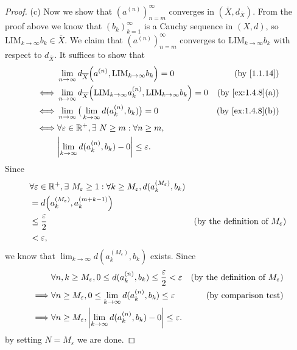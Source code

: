 \begin{proof}{(c)}
  Now we show that \((a^{(n)})_{n = m}^\infty\) converges in \((\overline{X}, d_{\overline{X}})\).
  From the proof above we know that \((b_k)_{k = 1}^\infty\) is a Cauchy sequence in \((X, d)\), so \(\text{LIM}_{k \to \infty} b_k \in \overline{X}\).
  We claim that \((a^{(n)})_{n = m}^\infty\) converges to \(\text{LIM}_{k \to \infty} b_k\) with respect to \(d_{\overline{X}}\).
  It suffices to show that
  \begin{align*}
         & \lim_{n \to \infty} d_{\overline{X}}\Big(a^{(n)}, \text{LIM}_{k \to \infty} b_k\Big) = 0                             & \text{(by \cref{1.1.14})}      \\
    \iff & \lim_{n \to \infty} d_{\overline{X}}\Big(\text{LIM}_{k \to \infty} a_k^{(n)}, \text{LIM}_{k \to \infty} b_k\Big) = 0 & \text{(by \cref{ex:1.4.8}(a))} \\
    \iff & \lim_{n \to \infty} \big(\lim_{k \to \infty} d(a_k^{(n)}, b_k)\big) = 0                                              & \text{(by \cref{ex:1.4.8}(b))} \\
    \iff & \forall \varepsilon \in \R^+, \exists\ N \geq m : \forall n \geq m,                                                                                   \\
         & \abs{\lim_{k \to \infty} d(a_k^{(n)}, b_k) - 0} \leq \varepsilon.
  \end{align*}
  Since
  \begin{align*}
     & \forall \varepsilon \in \mathbb{R}^+, \exists\ M_\varepsilon \geq 1 : \forall k \geq M_\varepsilon, d(a_k^{(M_\varepsilon)}, b_k)                                                   \\
     & = d\Big(a_k^{(M_\varepsilon)}, a_k^{(m + k - 1)}\Big)                                                                                                                       \\
     & \leq \frac{\varepsilon}{2}                                                                                                & \text{(by the definition of \(M_\varepsilon\))} \\
     & < \varepsilon,
  \end{align*}
  we know that \(\lim_{k \to \infty} d(a_k^{(M_\varepsilon)}, b_k)\) exists.
  Since
  \begin{align*}
             & \forall n, k \geq M_\varepsilon, 0 \leq d(a_k^{(n)}, b_k) \leq \frac{\varepsilon}{2} < \varepsilon & \text{(by the definition of \(M_\varepsilon\))} \\
    \implies & \forall n \geq M_\varepsilon, 0 \leq \lim_{k \to \infty} d(a_k^{(n)}, b_k) \leq \varepsilon        & \text{(by comparison test)}                     \\
    \implies & \forall n \geq M_\varepsilon, \left\lvert\lim_{k \to \infty} d(a_k^{(n)}, b_k) - 0\right\rvert \leq \varepsilon.
  \end{align*}
  by setting \(N = M_\varepsilon\) we are done.


\end{proof}
